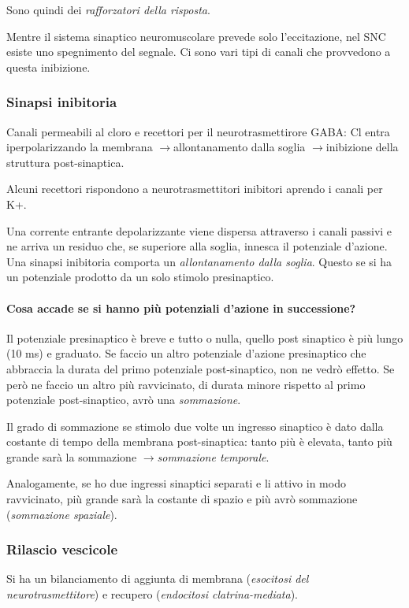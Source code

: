 \documentclass[a4paper,12pt]{article}
\newcommand{\lfreccia}{\ensuremath{\longrightarrow}}
\begin{document}
Sono quindi dei \emph{rafforzatori della risposta}.

Mentre il sistema sinaptico neuromuscolare prevede solo l'eccitazione, nel SNC esiste uno spegnimento del segnale. Ci sono vari tipi di canali che provvedono a questa inibizione.
\subsubsection{Sinapsi inibitoria}

Canali permeabili al cloro e recettori per il neurotrasmettirore GABA: Cl entra iperpolarizzando la membrana \lfreccia allontanamento dalla soglia \lfreccia inibizione della struttura post-sinaptica.

Alcuni recettori rispondono a neurotrasmettitori inibitori aprendo i canali per K+.


Una corrente entrante depolarizzante viene dispersa attraverso i canali passivi e ne arriva un residuo che, se superiore alla soglia, innesca il potenziale d'azione. Una sinapsi inibitoria comporta un \emph{allontanamento dalla soglia}. Questo se si ha un potenziale prodotto da un solo stimolo presinaptico.

\paragraph{Cosa accade se si hanno più potenziali d'azione in successione?}
Il potenziale presinaptico è breve e tutto o nulla, quello post sinaptico è più lungo (10 ms) e graduato. Se faccio un altro potenziale d'azione presinaptico che abbraccia la durata del primo potenziale post-sinaptico, non ne vedrò effetto. Se però ne faccio un altro più ravvicinato, di durata minore rispetto al primo potenziale post-sinaptico, avrò una \emph{sommazione}. 

Il grado di sommazione se stimolo due volte un ingresso sinaptico è dato dalla costante di tempo della membrana post-sinaptica: tanto più è elevata, tanto più grande sarà la sommazione \lfreccia \emph{sommazione temporale}.

Analogamente, se ho due ingressi sinaptici separati e li attivo in modo ravvicinato, più grande sarà la costante di spazio e più avrò sommazione (\emph{sommazione spaziale}).

\subsubsection{Rilascio vescicole}
Si ha un bilanciamento di aggiunta di membrana (\emph{esocitosi del neurotrasmettitore}) e recupero (\emph{endocitosi clatrina-mediata}).
\end{document}
